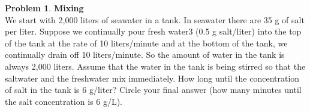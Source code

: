 \documentclass[10pt,leqno ]{article}
\theoremstyle{definition}
\newtheorem{problem}[theorem]{Problem}
\begin{document}
\begin{problem} \textbf{Mixing} \\
We start with 2,000 liters of seawater in a tank. In seawater there are 35 g of salt per liter. Suppose we continually pour fresh water3 (0.5 g salt/liter) into the top of the tank at the rate of 10 liters/minute and at the bottom of the tank, we continually drain off 10 liters/minute. So the amount of water in the tank is always 2,000 liters. Assume that the water in the tank is being stirred so that the saltwater and the freshwater mix immediately. How long until the concentration of salt in the tank is 6 g/liter? Circle your final answer (how many minutes until the salt concentration is 6 g/L).
\end{problem}
\end{document}
